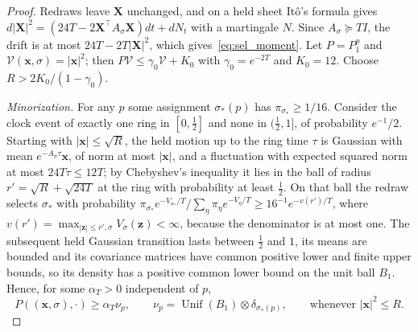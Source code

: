 \begin{proof}
Redraws leave $\mathbf X$ unchanged, and on a held sheet It\^o's formula gives $d|\mathbf X|^2=(24T-2\mathbf X^\top A_\sigma\mathbf X)dt+dN_t$ with a martingale $N$. Since $A_\sigma\succeq TI$, the drift is at most $24T-2T|\mathbf X|^2$, which gives~\eqref{eq:sel_moment}. Let $P=P^p_1$ and $\mathcal V(\mathbf x,\sigma)=|\mathbf x|^2$; then $P\mathcal V\le\gamma_0\mathcal V+K_0$ with $\gamma_0=e^{-2T}$ and $K_0=12$. Choose $R>2K_0/(1-\gamma_0)$.

\emph{Minorization.} For any $p$ some assignment $\sigma_*(p)$ has $\pi_{\sigma_*}\ge1/16$. Consider the clock event of exactly one ring in $[0,\frac12]$ and none in $(\frac12,1]$, of probability $e^{-1}/2$. Starting with $|\mathbf x|\le\sqrt R$, the held motion up to the ring time $\tau$ is Gaussian with mean $e^{-A_\sigma\tau}\mathbf x$, of norm at most $|\mathbf x|$, and a fluctuation with expected squared norm at most $24T\tau\le12T$; by Chebyshev's inequality it lies in the ball of radius $r'=\sqrt R+\sqrt{24T}$ at the ring with probability at least $\frac12$. On that ball the redraw selects $\sigma_*$ with probability $\pi_{\sigma_*}e^{-V_{\sigma_*}/T}/\sum_\eta\pi_\eta e^{-V_\eta/T}\ge16^{-1}e^{-v(r')/T}$, where $v(r')=\max_{|\mathbf z|\le r',\sigma}V_\sigma(\mathbf z)<\infty$, because the denominator is at most one. The subsequent held Gaussian transition lasts between $\frac12$ and $1$, its means are bounded and its covariance matrices have common positive lower and finite upper bounds, so its density has a positive common lower bound on the unit ball $B_1$. Hence, for some $\alpha_T>0$ independent of $p$,
\[
P((\mathbf x,\sigma),\cdot)\ge\alpha_T\nu_p,\qquad\nu_p=\operatorname{Unif}(B_1)\otimes\delta_{\sigma_*(p)},\qquad\text{whenever }|\mathbf x|^2\le R.
\]


\end{proof}
